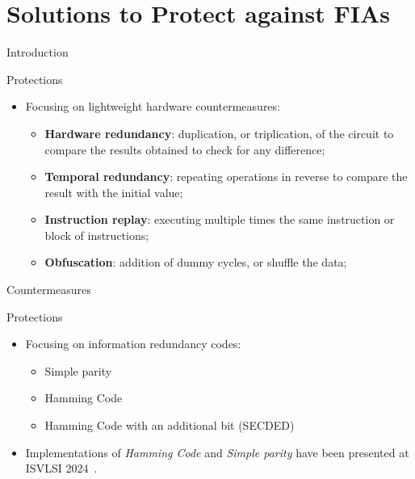 \section{Solutions to Protect against FIAs}

\begin{frame}{Introduction}
    \begin{block}{Protections}
        \begin{itemize}
            \item Focusing on lightweight hardware countermeasures:
            \begin{itemize}
                \item \textbf{Hardware redundancy}: duplication, or triplication, of the circuit to compare the results obtained to check for any difference;
                \item \textbf{Temporal redundancy}: repeating operations in reverse to compare the result with the initial value;
                \item \textbf{Instruction replay}: executing multiple times the same instruction or block of instructions;
                \item \textbf{Obfuscation}: addition of dummy cycles, or shuffle the data;
            \end{itemize}
        \end{itemize}
    \end{block}
\end{frame}

\begin{frame}{Countermeasures}
    \begin{block}{Protections}
        \begin{itemize}
            \item Focusing on information redundancy codes:
            \begin{itemize}
                \item Simple parity
                \item Hamming Code
                \item Hamming Code with an additional bit (SECDED)
            \end{itemize}
            \item Implementations of \textit{Hamming Code} and \textit{Simple parity} have been presented at ISVLSI 2024~\cite{PRLG-24-isvlsi}.
        \end{itemize}
    \end{block}
\end{frame}

